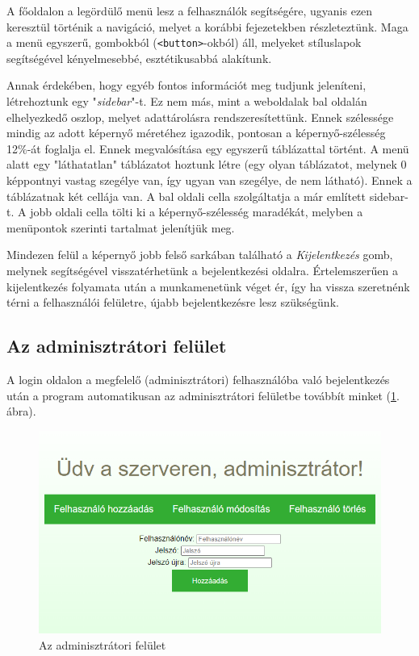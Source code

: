 A főoldalon a legördülő menü lesz a felhasználók segítségére, ugyanis ezen keresztül történik a navigáció, melyet a korábbi fejezetekben részleteztünk. Maga a menü egyszerű, gombokból (\texttt{<button>}-okból) áll, melyeket stíluslapok segítségével kényelmesebbé, esztétikusabbá alakítunk.

Annak érdekében, hogy egyéb fontos információt meg tudjunk jeleníteni, létrehoztunk egy "\textit{sidebar}"-t. Ez nem más, mint a weboldalak bal oldalán elhelyezkedő oszlop, melyet adattárolásra rendszeresítettünk. Ennek szélessége mindig az adott képernyő méretéhez igazodik, pontosan a képernyő-szélesség 12\%-át foglalja el. Ennek megvalósítása egy egyszerű táblázattal történt. A menü alatt egy "láthatatlan" táblázatot hoztunk létre (egy olyan táblázatot, melynek 0 képpontnyi vastag szegélye van, így ugyan van szegélye, de nem látható). Ennek a táblázatnak két cellája van. A bal oldali cella szolgáltatja a már említett sidebar-t. A jobb oldali cella tölti ki a képernyő-szélesség maradékát, melyben a menüpontok szerinti tartalmat jelenítjük meg.

Mindezen felül a képernyő jobb felső sarkában található a \textit{Kijelentkezés} gomb, melynek segítségével visszatérhetünk a bejelentkezési oldalra. Értelemszerűen a kijelentkezés folyamata után a munkamenetünk véget ér, így ha vissza szeretnénk térni a felhasználói felületre, újabb bejelentkezésre lesz szükségünk.


\subsection{Az adminisztrátori felület}

A login oldalon a megfelelő (adminisztrátori) felhasználóba való bejelentkezés után a program automatikusan az adminisztrátori felületbe továbbít minket (\ref{fig:admin}. ábra).

\begin{figure}[h]
	\centering
		\includegraphics[width=12truecm, height=7truecm]{images/admin_oldal.png}
	\caption{Az adminisztrátori felület}
	\label{fig:admin}
\end{figure}

